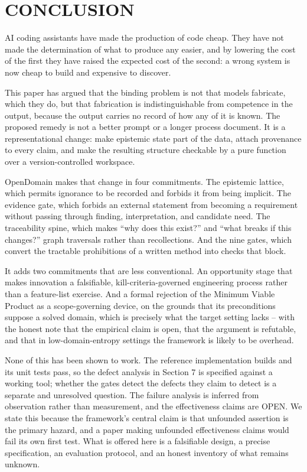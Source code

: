 \documentclass[11pt,a4paper]{article}
\begin{document}
\section{CONCLUSION}

AI coding assistants have made the production of code cheap. They have not made the determination of what to produce any easier, and by lowering the cost of the first they have raised the expected cost of the second: a wrong system is now cheap to build and expensive to discover.

This paper has argued that the binding problem is not that models fabricate, which they do, but that fabrication is indistinguishable from competence in the output, because the output carries no record of how any of it is known. The proposed remedy is not a better prompt or a longer process document. It is a representational change: make epistemic state part of the data, attach provenance to every claim, and make the resulting structure checkable by a pure function over a version-controlled workspace.

OpenDomain makes that change in four commitments. The epistemic lattice, which permits ignorance to be recorded and forbids it from being implicit. The evidence gate, which forbids an external statement from becoming a requirement without passing through finding, interpretation, and candidate need. The traceability spine, which makes ``why does this exist?'' and ``what breaks if this changes?'' graph traversals rather than recollections. And the nine gates, which convert the tractable prohibitions of a written method into checks that block.

It adds two commitments that are less conventional. An opportunity stage that makes innovation a falsifiable, kill-criteria-governed engineering process rather than a feature-list exercise. And a formal rejection of the Minimum Viable Product as a scope-governing device, on the grounds that its preconditions suppose a solved domain, which is precisely what the target setting lacks -- with the honest note that the empirical claim is open, that the argument is refutable, and that in low-domain-entropy settings the framework is likely to be overhead.

None of this has been shown to work. The reference implementation builds and its unit tests pass, so the defect analysis in Section 7 is specified against a working tool; whether the gates detect the defects they claim to detect is a separate and unresolved question. The failure analysis is inferred from observation rather than measurement, and the effectiveness claims are OPEN. We state this because the framework's central claim is that unfounded assertion is the primary hazard, and a paper making unfounded effectiveness claims would fail its own first test. What is offered here is a falsifiable design, a precise specification, an evaluation protocol, and an honest inventory of what remains unknown.
\end{document}
